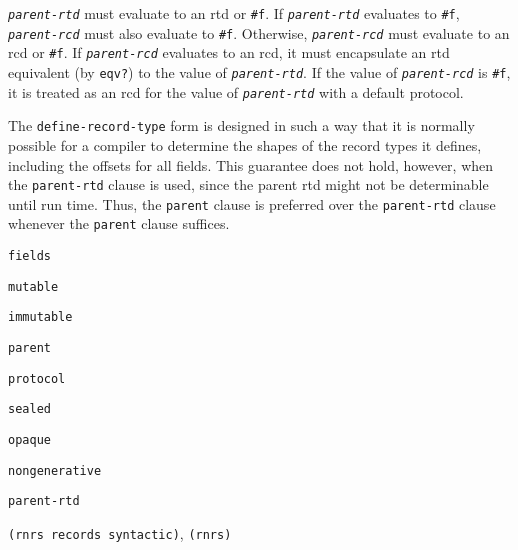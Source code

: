 \texttt{\textit{parent-rtd}} must evaluate to an rtd or \texttt{\#{}f}.
If \texttt{\textit{parent-rtd}} evaluates to \texttt{\#{}f}, \texttt{\textit{parent-rcd}} must
also evaluate to \texttt{\#{}f}.
Otherwise, \texttt{\textit{parent-rcd}} must evaluate to an rcd or \texttt{\#{}f}.
If \texttt{\textit{parent-rcd}} evaluates to an rcd, it must encapsulate an rtd
equivalent (by \texttt{eqv?}) to the value of \texttt{\textit{parent-rtd}}.
If the value of \texttt{\textit{parent-rcd}} is \texttt{\#{}f}, it is treated as an rcd
for the value of \texttt{\textit{parent-rtd}} with a default protocol.

The \texttt{define-record-type} form is designed in such a way that it is
normally possible for a compiler to determine the shapes of the record
types it defines, including the offsets for all fields.
This guarantee does not hold, however, when the \texttt{parent-rtd} clause
is used, since the parent rtd might not be determinable until run time.
Thus, the \texttt{parent} clause is preferred over the \texttt{parent-rtd}
clause whenever the \texttt{parent} clause suffices.


\begin{description}

\label{records_s16}\item[syntax] \texttt{fields}



\item[syntax] \texttt{mutable}



\item[syntax] \texttt{immutable}



\item[syntax] \texttt{parent}



\item[syntax] \texttt{protocol}



\item[syntax] \texttt{sealed}



\item[syntax] \texttt{opaque}



\item[syntax] \texttt{nongenerative}



\item[syntax] \texttt{parent-rtd}



\item[libraries] \texttt{(rnrs records syntactic)}, \texttt{(rnrs)}
\end{description}


